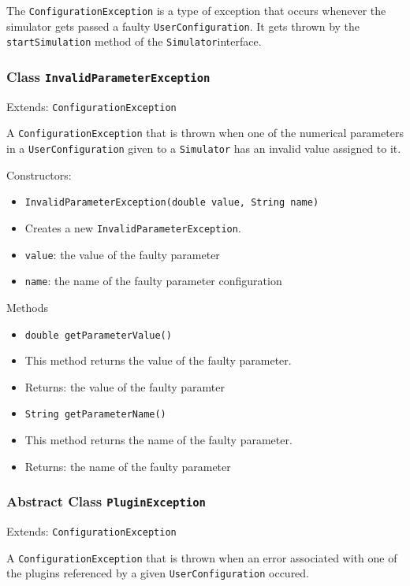 \documentclass[parskip=full,11pt]{scrartcl}
\begin{document}
The \texttt{ConfigurationException} is a type of exception that occurs whenever the simulator gets passed a faulty \texttt{UserConfiguration}. It gets thrown by the \texttt{startSimulation} method of the \texttt{Simulator}interface.

\subsubsection{Class \texttt{InvalidParameterException}}
Extends: \texttt{ConfigurationException}

A \texttt{ConfigurationException} that is thrown when one of the numerical parameters in a \texttt{UserConfiguration} given to a \texttt{Simulator} has an invalid value assigned to it.

Constructors:
\begin{itemize} \itemsep -10pt
	\item \texttt{InvalidParameterException(double value, String name)}
	\item[] Creates a new \texttt{InvalidParameterException}.
	\item[] \texttt{value}: the value of the faulty parameter
	\item[] \texttt{name}: the name of the faulty parameter configuration
\end{itemize}

Methods
\begin{itemize}\itemsep -10pt
	\item \texttt{double getParameterValue()}
	\item[] This method returns the value of the faulty parameter.
	\item[] Returns: the value of the faulty paramter
	\item \texttt{String getParameterName()}
	\item[] This method returns the name of the faulty parameter.
	\item[] Returns: the name of the faulty parameter
\end{itemize}

\subsubsection{Abstract Class \texttt{PluginException}}
Extends: \texttt{ConfigurationException}

A \texttt{ConfigurationException} that is thrown when an error associated with one of the plugins referenced by a given \texttt{UserConfiguration} occured.
\end{document}
